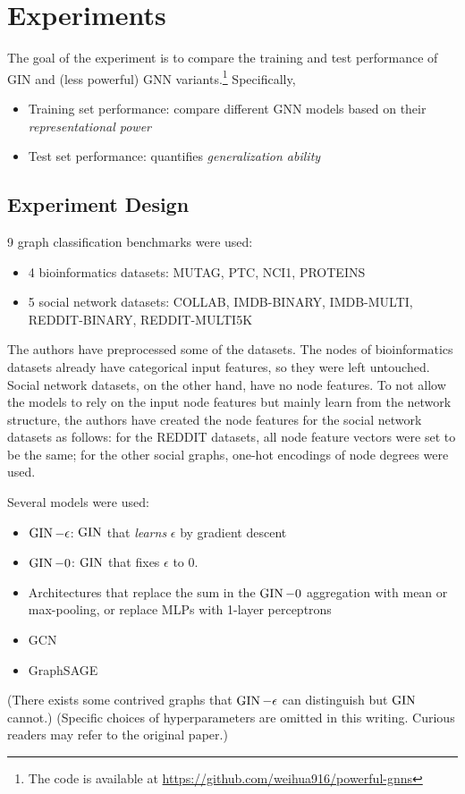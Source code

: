 \chapter{Experiments}

The goal of the experiment is to compare the training and test performance of GIN and (less powerful) GNN variants.\footnote{The code is available at \url{https://github.com/weihua916/powerful-gnns}}
Specifically,

\begin{itemize}
	\item Training set performance: compare different GNN models based on their {\it representational power}

	\item Test set performance: quantifies {\it generalization ability}
\end{itemize}

\section{Experiment Design}

9 graph classification benchmarks\cite{Yanardag2015} were used:

\begin{itemize}
	\item 4 bioinformatics datasets: MUTAG, PTC, NCI1, PROTEINS
	\item 5 social network datasets: COLLAB, IMDB-BINARY, IMDB-MULTI, REDDIT-BINARY, REDDIT-MULTI5K
\end{itemize}

The authors have preprocessed some of the datasets.
The nodes of bioinformatics datasets already have categorical input features, so they were left untouched.
Social network datasets, on the other hand, have no node features. To not allow the models to rely on the input node features but mainly learn from the network structure, the authors have created the node features for the social network datasets as follows: for the REDDIT datasets, all node feature vectors were set to be the same; for the other social graphs, one-hot encodings of node degrees were used.

Several models were used:
\begin{itemize}
	\item $\operatorname{GIN}-\epsilon$: $\operatorname{GIN}$ that {\it learns} $\epsilon$ by gradient descent
	\item $\operatorname{GIN}-0$: $\operatorname{GIN}$ that fixes $\epsilon$ to $0$.
	\item Architectures that replace the sum in the $\operatorname{GIN}-0$ aggregation with mean or max-pooling, or replace MLPs with 1-layer perceptrons
	\item GCN
	\item GraphSAGE
\end{itemize}
(There exists some contrived graphs that $\operatorname{GIN}-\epsilon$ can distinguish but $\operatorname{GIN}$ cannot.)
(Specific choices of hyperparameters are omitted in this writing. Curious readers may refer to the original paper\cite{Wu2019}.)

